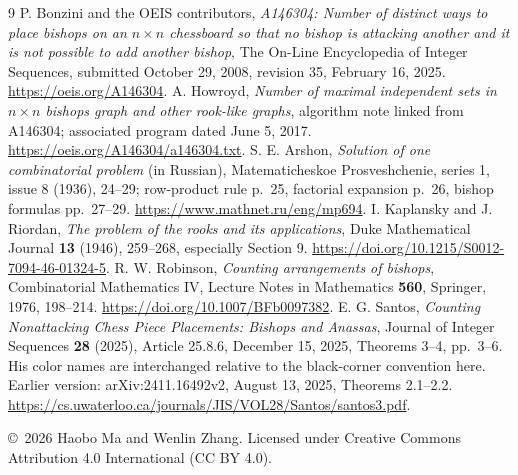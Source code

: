 \documentclass[11pt]{article}
\begin{document}
\begin{thebibliography}{9}
P. Bonzini and the OEIS contributors,
\emph{A146304: Number of distinct ways to place bishops on an $n\times n$
chessboard so that no bishop is attacking another and it is not possible to
add another bishop}, The On-Line Encyclopedia of Integer Sequences,
submitted October 29, 2008, revision 35, February 16, 2025.
\url{https://oeis.org/A146304}.
A. Howroyd, \emph{Number of maximal independent sets in $n\times n$
bishops graph and other rook-like graphs}, algorithm note linked from
A146304; associated program dated June 5, 2017.
\url{https://oeis.org/A146304/a146304.txt}.
S. E. Arshon, \emph{Solution of one combinatorial problem} (in Russian),
Matematicheskoe Prosveshchenie, series 1, issue 8 (1936), 24--29;
row-product rule p.~25, factorial expansion p.~26, bishop formulas
pp.~27--29.
\url{https://www.mathnet.ru/eng/mp694}.
I. Kaplansky and J. Riordan, \emph{The problem of the rooks and its
applications}, Duke Mathematical Journal \textbf{13} (1946), 259--268,
especially Section 9.
\url{https://doi.org/10.1215/S0012-7094-46-01324-5}.
R. W. Robinson, \emph{Counting arrangements of bishops},
Combinatorial Mathematics IV, Lecture Notes in Mathematics
\textbf{560}, Springer, 1976, 198--214.
\url{https://doi.org/10.1007/BFb0097382}.
E. G. Santos, \emph{Counting Nonattacking Chess Piece Placements:
Bishops and Anassas}, Journal of Integer Sequences \textbf{28}
(2025), Article 25.8.6, December 15, 2025, Theorems 3--4, pp.~3--6.
His color names are interchanged relative to the black-corner convention
here. Earlier version: arXiv:2411.16492v2, August 13, 2025,
Theorems 2.1--2.2.
\url{https://cs.uwaterloo.ca/journals/JIS/VOL28/Santos/santos3.pdf}.
\end{thebibliography}
\medskip
\noindent\small\copyright\ 2026 Haobo Ma and Wenlin Zhang.
Licensed under Creative Commons Attribution 4.0 International (CC BY 4.0).
\end{document}

